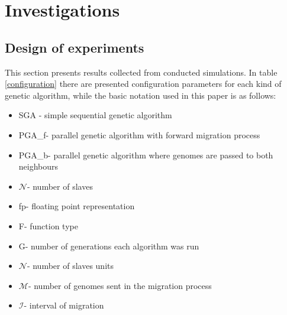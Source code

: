 \section{Investigations}
\label{cha:investigation}
\subsection{Design of experiments}
This section presents results collected from conducted simulations. In
table \ref{configuration} there are presented configuration parameters for each kind
of genetic algorithm, while the basic notation used in this paper is as follows:
\begin{itemize}
	\item SGA - simple sequential genetic algorithm
	\item PGA\_f- parallel genetic algorithm with forward migration process
	\item PGA\_b- parallel genetic algorithm where genomes are passed to
			both neighbours
	\item $\mathcal{N}$- number of slaves 
	\item fp- floating point representation
	\item F- function type 
	\item G- number of generations each algorithm was run
	\item $\mathcal{N}$- number of slaves units
	\item $\mathcal{M}$- number of genomes sent in the migration process
	\item $\mathcal{I}$- interval of migration
\end{itemize}
\pagebreak
